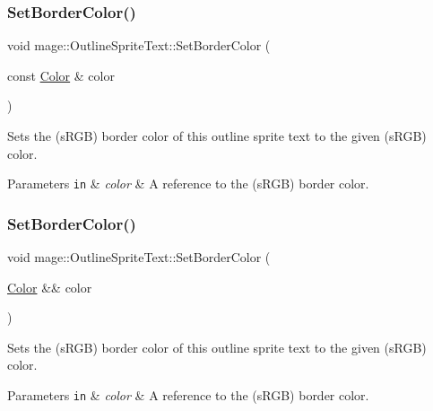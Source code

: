 \subsubsection{\texorpdfstring{Set\+Border\+Color()}{SetBorderColor()}\hspace{0.1cm}{\footnotesize\ttfamily [1/3]}}
{\footnotesize\ttfamily void mage\+::\+Outline\+Sprite\+Text\+::\+Set\+Border\+Color (\begin{DoxyParamCaption}\item[{const \hyperlink{structmage_1_1_color}{Color} \&}]{color }\end{DoxyParamCaption})\hspace{0.3cm}{\ttfamily [noexcept]}}

Sets the (s\+R\+GB) border color of this outline sprite text to the given (s\+R\+GB) color.


\begin{DoxyParams}[1]{Parameters}
\mbox{\tt in}  & {\em color} & A reference to the (s\+R\+GB) border color. \\
\hline
\end{DoxyParams}
\hypertarget{classmage_1_1_outline_sprite_text_a7bd6e4fc0afefb65ca9d543f52941400}{}\label{classmage_1_1_outline_sprite_text_a7bd6e4fc0afefb65ca9d543f52941400} 
\subsubsection{\texorpdfstring{Set\+Border\+Color()}{SetBorderColor()}\hspace{0.1cm}{\footnotesize\ttfamily [2/3]}}
{\footnotesize\ttfamily void mage\+::\+Outline\+Sprite\+Text\+::\+Set\+Border\+Color (\begin{DoxyParamCaption}\item[{\hyperlink{structmage_1_1_color}{Color} \&\&}]{color }\end{DoxyParamCaption})\hspace{0.3cm}{\ttfamily [noexcept]}}

Sets the (s\+R\+GB) border color of this outline sprite text to the given (s\+R\+GB) color.


\begin{DoxyParams}[1]{Parameters}
\mbox{\tt in}  & {\em color} & A reference to the (s\+R\+GB) border color. \\
\hline
\end{DoxyParams}
\hypertarget{classmage_1_1_outline_sprite_text_a861b01bf303caf0c08a599f3d4a77894}{}\label{classmage_1_1_outline_sprite_text_a861b01bf303caf0c08a599f3d4a77894} 
